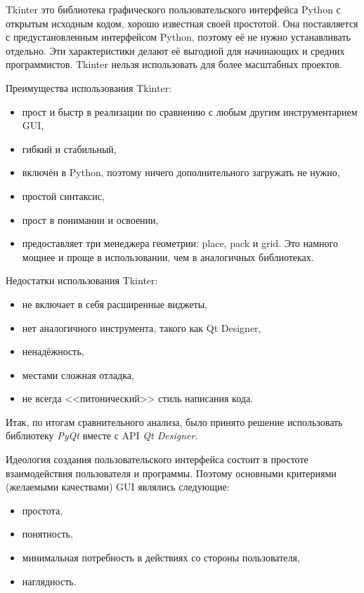 Tkinter это библиотека графического пользовательского интерфейса Python с открытым исходным кодом, хорошо известная своей простотой. Она поставляется с предустановленным интерфейсом Python, поэтому её не нужно устанавливать отдельно. Эти характеристики делают её выгодной для начинающих и средних программистов. Tkinter нельзя использовать для более масштабных проектов.

Преимущества использования Tkinter:
\begin{itemize}
	\item прост и быстр в реализации по сравнению с любым другим инструментарием GUI,
	\item гибкий и стабильный,
	\item включён в Python, поэтому ничего дополнительного загружать не нужно,
	\item простой синтаксис,
	\item прост в понимании и освоении,
	\item предоставляет три менеджера геометрии: place, pack и grid. Это намного мощнее и проще в использовании, чем в аналогичных библиотеках.
\end{itemize}

Недостатки использования Tkinter:
\begin{itemize}
	\item не включает в себя расширенные виджеты,
	\item нет аналогичного инструмента, такого как Qt Designer,
	\item ненадёжность,
	\item местами сложная отладка,
	\item не всегда <<питонический>> стиль написания кода.
\end{itemize}

Итак, по итогам сравнительного анализа, было принято решение использовать библиотеку \textit{PyQt} вместе с API \textit{Qt Designer}.

Идеология создания пользовательского интерфейса состоит в простоте взаимодействия пользователя и программы. Поэтому основными критериями (желаемыми качествами) GUI являлись следующие:
\begin{itemize}
	\item простота,
	\item понятность,
	\item минимальная потребность в действиях со стороны пользователя,
	\item наглядность.
\end{itemize}

